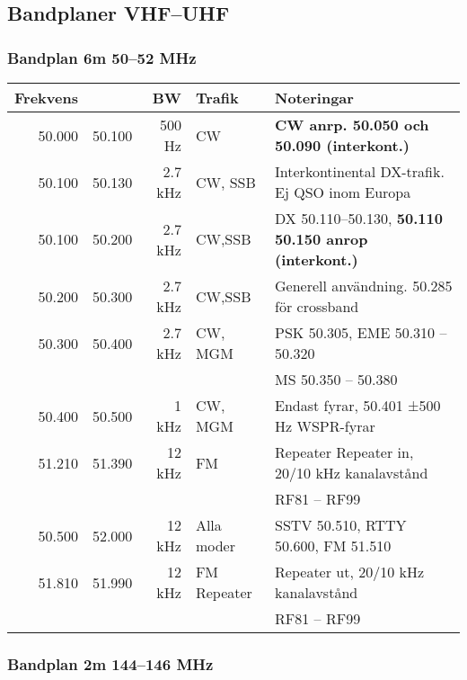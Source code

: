 \begin{landscape}
\subsection{Bandplaner VHF--UHF}
\subsubsection{Bandplan 6m 50--52 MHz}
\begin{tabular}{rrrll}

\textbf{Frekvens} &  & \textbf{BW} & \textbf{Trafik} & \textbf{Noteringar} \\ \hline

50.000 & 50.100 & 500 Hz  & CW          & \textbf{CW anrp. 50.050 och 50.090 (interkont.)}             \\ \hline
50.100 & 50.130 & 2.7 kHz & CW, SSB     & Interkontinental DX-trafik. Ej QSO inom Europa               \\ \hline
50.100 & 50.200 & 2.7 kHz & CW,SSB      & DX 50.110--50.130, \textbf{50.110 50.150 anrop (interkont.)} \\ \hline
50.200 & 50.300 & 2.7 kHz & CW,SSB      & Generell användning. 50.285 för crossband                    \\ \hline
50.300 & 50.400 & 2.7 kHz & CW, MGM     & PSK 50.305, EME 50.310 – 50.320                              \\
       &        &         &             & MS 50.350 – 50.380                                           \\ \hline
50.400 & 50.500 & 1 kHz   & CW, MGM     & Endast fyrar, 50.401 ±500 Hz WSPR-fyrar                      \\ \hline
51.210 & 51.390 & 12 kHz  & FM          & Repeater Repeater in, 20/10 kHz kanalavstånd                 \\
       &        &         &             & RF81 – RF99                                                  \\ \hline
50.500 & 52.000 & 12 kHz  & Alla moder  & SSTV 50.510, RTTY 50.600, FM 51.510                          \\ \hline
51.810 & 51.990 & 12 kHz  & FM Repeater & Repeater ut, 20/10 kHz kanalavstånd                          \\
       &        &         &             & RF81 – RF99                                                  \\ \hline

\end{tabular}
\clearpage
\subsubsection{Bandplan 2m 144--146 MHz}
\begin{tabular}{rrrll}


\end{tabular}
\end{landscape}
